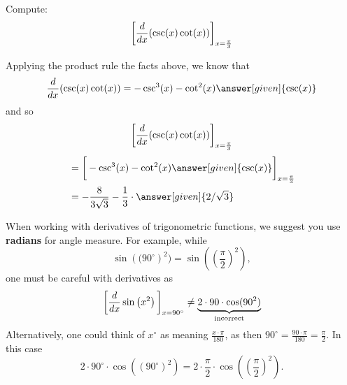 \documentclass{ximera}
\begin{document}
\begin{example}
Compute:
\[
\bigg[ \frac{d}{\mathop{}\!d x} ( \csc(x) \cot(x) ) \bigg]_{x=\frac{\pi}{3}}
\]
\begin{explanation}
Applying the product rule the facts above, we know that
\[
\ddx ( \csc(x) \cot(x) ) = - \csc^3(x) - \cot^2(x)\answer[given]{\csc(x)}
\]
and so
\[
\bigg[ \frac{d}{\mathop{}\!d x} ( \csc(x) \cot(x) ) \bigg]_{x=\frac{\pi}{3}}
\]
\begin{align*}
  &= \eval{  - \csc^3(x) - \cot^2(x) \answer[given]{\csc(x)}}_{x=\frac{\pi}{3}}  \\
&= - \frac{8}{3 \sqrt{3}} - \frac{1}{3}\cdot \answer[given]{2/\sqrt{3}}
\end{align*}
\end{explanation}
\end{example}


\begin{warning}
When working with derivatives of trigonometric functions, we suggest
you use \textbf{radians} for angle measure. For example, while
\[
\sin\left((90^\circ\right)^2) = \sin\left(\left(\frac{\pi}{2}\right)^2\right),
\]
one must be careful with derivatives as
\[
\bigg[ \frac{d}{\mathop{}\!d x} \sin\left(x^2\right) \bigg]_{x=90^\circ} \ne \underbrace{2\cdot 90\cdot \cos(90^2)}_{\text{incorrect}}
\]
Alternatively, one could think of $x^\circ$ as meaning
$\frac{x\cdot\pi}{180}$, as then $90^\circ = \frac{90\cdot\pi}{180} =
\frac{\pi}{2}$. In this case
\[
2\cdot 90^\circ\cdot \cos((90^\circ)^2) = 2\cdot \frac{\pi}{2}\cdot\cos\left(\left(\frac{\pi}{2}\right)^2\right).
\]
\end{warning}
\end{document}
